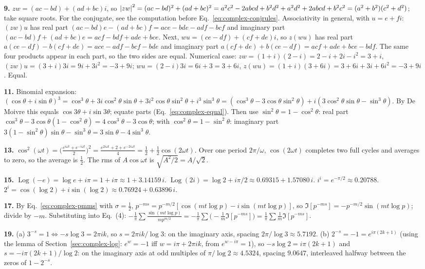 \textbf{9.} $zw=(ac-bd)+(ad+bc)i$, so $\left\lvert zw\right\rvert^2=(ac-bd)^2+(ad+bc)^2=a^2c^2-2abcd+b^2d^2+a^2d^2+2abcd+b^2c^2=(a^2+b^2)(c^2+d^2)$; take square roots. For the conjugate, see the computation before Eq.~\eqref{eq:complex-conjrules}. Associativity in general, with $u=e+fi$: $(zw)u$ has real part $(ac-bd)e-(ad+bc)f=ace-bde-adf-bcf$ and imaginary part $(ac-bd)f+(ad+bc)e=acf-bdf+ade+bce$. Next, $wu=(ce-df)+(cf+de)i$, so $z(wu)$ has real part $a(ce-df)-b(cf+de)=ace-adf-bcf-bde$ and imaginary part $a(cf+de)+b(ce-df)=acf+ade+bce-bdf$. The same four products appear in each part, so the two sides are equal. Numerical case: $zw=(1+i)(2-i)=2-i+2i-i^2=3+i$, $(zw)u=(3+i)3i=9i+3i^2=-3+9i$; $wu=(2-i)3i=6i+3=3+6i$, $z(wu)=(1+i)(3+6i)=3+6i+3i+6i^2=-3+9i$. Equal.

\textbf{11.} Binomial expansion: $(\cos\theta+i\sin\theta)^3=\cos^3\theta+3i\cos^2\theta\sin\theta+3i^2\cos\theta\sin^2\theta+i^3\sin^3\theta=(\cos^3\theta-3\cos\theta\sin^2\theta)+i(3\cos^2\theta\sin\theta-\sin^3\theta)$. By De Moivre this equals $\cos3\theta+i\sin3\theta$; equate parts (Eq.~\eqref{eq:complex-equal}). Then use $\sin^2\theta=1-\cos^2\theta$: real part $\cos^3\theta-3\cos\theta(1-\cos^2\theta)=4\cos^3\theta-3\cos\theta$; with $\cos^2\theta=1-\sin^2\theta$: imaginary part $3(1-\sin^2\theta)\sin\theta-\sin^3\theta=3\sin\theta-4\sin^3\theta$.

\textbf{13.} $\cos^2(\omega t)=\bigl(\tfrac{e^{i\omega t}+e^{-i\omega t}}2\bigr)^2=\tfrac{e^{2i\omega t}+2+e^{-2i\omega t}}4=\tfrac12+\tfrac12\cos(2\omega t)$. Over one period $2\pi/\omega$, $\cos(2\omega t)$ completes two full cycles and averages to zero, so the average is $\tfrac12$. The rms of $A\cos\omega t$ is $\sqrt{A^2/2}=A/\sqrt2$.

\textbf{15.} $\operatorname{Log}(-e)=\log e+i\pi=1+i\pi\approx1+3.14159\,i$. $\operatorname{Log}(2i)=\log2+i\pi/2\approx0.69315+1.57080\,i$. $i^i=e^{-\pi/2}\approx0.20788$. $2^i=\cos(\log2)+i\sin(\log2)\approx0.76924+0.63896\,i$.

\textbf{17.} By Eq.~\eqref{eq:complex-pmms} with $\sigma=\tfrac12$, $p^{-ms}=p^{-m/2}[\cos(mt\log p)-i\sin(mt\log p)]$, so $\Im[p^{-ms}]=-p^{-m/2}\sin(mt\log p)$; divide by $-m$. Substituting into Eq.~(4): $-\frac1\pi\sum\frac{\sin(mt\log p)}{mp^{m/2}}=-\frac1\pi\sum\bigl(-\frac1m\Im[p^{-ms}]\bigr)=\frac1\pi\sum\frac1m\Im[p^{-ms}]$.

\textbf{19.} (a) $3^{-s}=1\iff-s\log3=2\pi ik$, so $s=2\pi ik/\log3$: on the imaginary axis, spacing $2\pi/\log3\approx5.7192$. (b) $2^{-s}=-1=e^{i\pi(2k+1)}$ (using the lemma of Section~\ref{sec:complex-log}: $e^{w}=-1$ iff $w=i\pi+2\pi ik$, from $e^{w-i\pi}=1$), so $-s\log2=i\pi(2k+1)$ and $s=-i\pi(2k+1)/\log2$: on the imaginary axis at odd multiples of $\pi/\log2\approx4.5324$, spacing $9.0647$, interleaved halfway between the zeros of $1-2^{-s}$.

